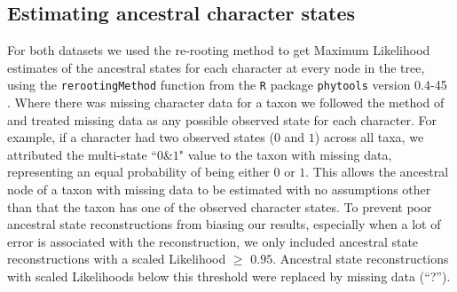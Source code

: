 \subsection{Estimating ancestral character states}
For both datasets we used the re-rooting method \citep{Yang01121995,Garland2000} to get Maximum Likelihood estimates of the ancestral states for each character at every node in the tree, using the \texttt{rerootingMethod} function from the \texttt{R} package \texttt{phytools} version 0.4-45 \citep{phytools,R}.
Where there was missing character data for a taxon we followed the method of \cite{Claddis} and treated missing data as any possible observed state for each character.
For example, if a character had two observed states ($0$ and $1$) across all taxa, we attributed the multi-state ``$0$\&$1$" value to the taxon with missing data, representing an equal probability of being either $0$ or $1$.
This allows the ancestral node of a taxon with missing data to be estimated with no assumptions other than that the taxon has one of the observed character states.
To prevent poor ancestral state reconstructions from biasing our results, especially when a lot of error is associated with the reconstruction, we only included ancestral state reconstructions with a scaled Likelihood $\geq$ $0.95$.
Ancestral state reconstructions with scaled Likelihoods below this threshold were replaced by missing data (``?'').

